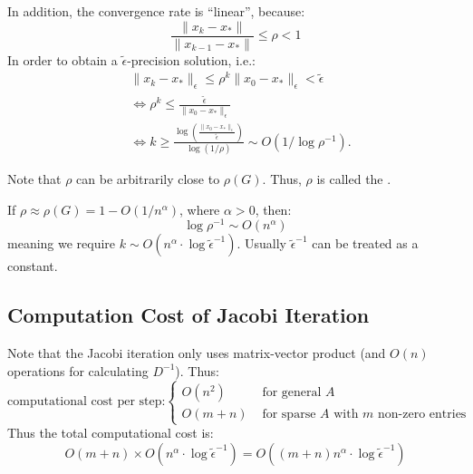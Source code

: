\documentclass[../main/main.tex]{subfiles}
\begin{document}
In addition, the convergence rate is ``linear'', because: \[
\frac{\|x_{k}-x_{*}\|}{\|x_{k-1}-x_{*}\|}\leq \rho < 1
\]
In order to obtain a $\tilde{\epsilon}$-precision solution, i.e.: \begin{align*}
&                                                                    \|x_{k}-x_{*}\|_{\epsilon}\leq \rho^{k}\|x_{0}-x_{*}\|_{\epsilon}< \tilde{\epsilon}\\
                                                                    &\iff \rho^{k}\leq \frac{\tilde{\epsilon}}{\|x_{0}-x_{*}\|_{\epsilon}}\\
    &\iff k\geq \frac{\log\left(\frac{\|x_{0}-x_{*}\|_{\epsilon}}{\tilde{\epsilon}} \right)}{\log(1 / \rho)} \sim O(1 / \log \rho ^{-1})
                                                                    .\end{align*}
\begin{remark}
  Note that $\rho$ can be arbitrarily close to $\rho(G)$. Thus, $\rho$ is called the .
\end{remark}
\begin{remark}
  If $\rho \approx \rho(G)= 1-O(1 / n^{\alpha})$, where $\alpha > 0$, then: \[
    \log \rho^{-1}\sim O(n^{\alpha})
  \] meaning we require $k\sim O(n^{\alpha}\cdot\log \tilde{\epsilon}^{-1})$. Usually $\tilde{\epsilon}^{-1}$ can be treated as a constant.
\end{remark}

\subsection{Computation Cost of Jacobi Iteration}
Note that the Jacobi iteration only uses matrix-vector product (and $O(n)$ operations for calculating $D^{-1}$). Thus: \[
  \text{computational cost per step:}
\begin{cases}
  O(n^2)& \text{ for general $A$ } \\
  O(m+n)&\text{ for sparse $A$ with $m$ non-zero entries}
\end{cases}
\]
Thus the total computational cost is: \[
O(m+n)\times O(n^{\alpha}\cdot \log \tilde{\epsilon}^{-1}) = O((m+n)n^{\alpha}\cdot \log \tilde{\epsilon}^{-1})
\]
\end{document}
